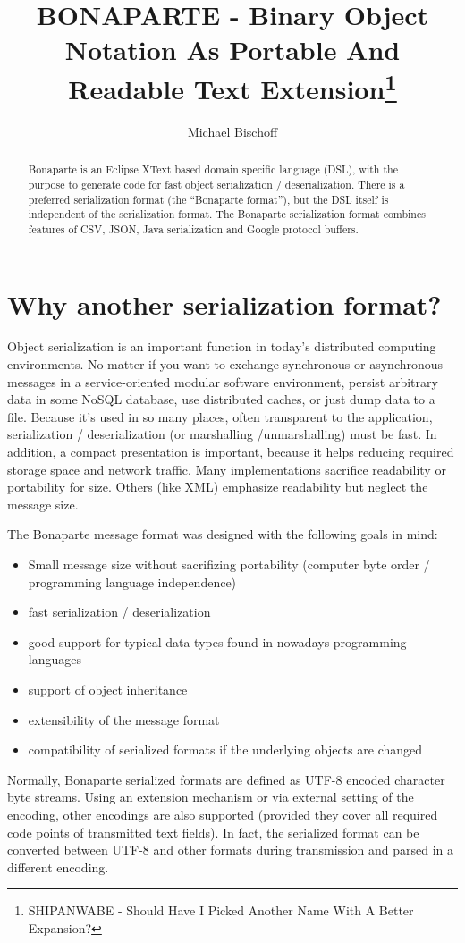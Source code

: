 \documentclass[11pt,a4paper,oneside]{article}
\title{BONAPARTE - Binary Object Notation As Portable And Readable Text
Extension\footnote{SHIPANWABE - Should Have I Picked Another Name With A Better Expansion?}
}
\author{Michael Bischoff}
\begin{document}
\maketitle
\begin{abstract}
Bonaparte is an Eclipse XText based domain specific language (DSL), with the purpose to generate code for fast object serialization / deserialization.
There is a preferred serialization format (the ``Bonaparte format''), but the DSL itself is independent of the serialization format. 
The Bonaparte serialization format combines features of CSV, JSON, Java serialization and Google protocol buffers.
\end{abstract}
\section{Why another serialization format?}
Object serialization is an important function in today's distributed computing
environments. No matter if you want to exchange synchronous or asynchronous
messages in a service-oriented modular software environment, persist
arbitrary data in some NoSQL database, use distributed caches, or just dump data
to a file.
Because it's used in so many places, often transparent to the application,
serialization / deserialization (or marshalling /unmarshalling) must be fast. In
addition, a compact presentation is important, because it helps reducing
required storage space and network traffic.
Many implementations sacrifice readability or portability for size. Others (like XML)
emphasize readability but neglect the message size.

The Bonaparte message format was designed with the following goals in mind:
\begin{itemize}
  \item Small message size without sacrifizing portability (computer byte order
  / programming language independence)
  \item fast serialization / deserialization
  \item good support for typical data types found in nowadays programming
  languages
  \item support of object inheritance
  \item extensibility of the message format
  \item compatibility of serialized formats if the underlying objects are
  changed
\end{itemize}
Normally, Bonaparte serialized formats are defined as UTF-8 encoded character byte streams.
Using an extension mechanism or via external setting of the encoding, other encodings are also supported (provided they cover all required code points of transmitted text fields).
In fact, the serialized format can be converted between UTF-8 and other formats during transmission and parsed in a different encoding. 
\end{document}
